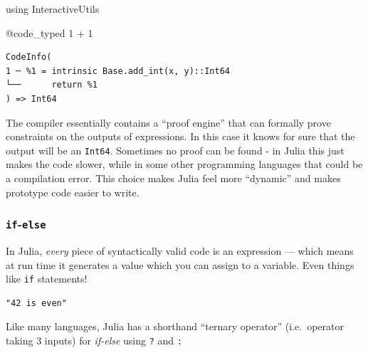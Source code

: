 \documentclass[
]{article}
\newenvironment{Shaded}{\begin{snugshade}}{\end{snugshade}}
\newcommand{\BuiltInTok}[1]{\textcolor[rgb]{0.00,0.23,0.31}{#1}}
\newcommand{\ControlFlowTok}[1]{\textcolor[rgb]{0.00,0.23,0.31}{\textbf{#1}}}
\newcommand{\FloatTok}[1]{\textcolor[rgb]{0.68,0.00,0.00}{#1}}
\newcommand{\ImportTok}[1]{\textcolor[rgb]{0.00,0.46,0.62}{#1}}
\newcommand{\NormalTok}[1]{\textcolor[rgb]{0.00,0.23,0.31}{#1}}
\newcommand{\OperatorTok}[1]{\textcolor[rgb]{0.37,0.37,0.37}{#1}}
\newcommand{\PreprocessorTok}[1]{\textcolor[rgb]{0.68,0.00,0.00}{#1}}
\newcommand{\SpecialCharTok}[1]{\textcolor[rgb]{0.37,0.37,0.37}{#1}}
\newcommand{\StringTok}[1]{\textcolor[rgb]{0.13,0.47,0.30}{#1}}
\begin{document}
\begin{Shaded}
\begin{Highlighting}[]
\ImportTok{using} \BuiltInTok{InteractiveUtils}

\PreprocessorTok{@code\_typed} \FloatTok{1} \OperatorTok{+} \FloatTok{1}
\end{Highlighting}
\end{Shaded}

\begin{verbatim}
CodeInfo(
1 ─ %1 = intrinsic Base.add_int(x, y)::Int64
└──      return %1
) => Int64
\end{verbatim}

The compiler essentially contains a ``proof engine'' that can formally
prove constraints on the outputs of expressions. In this case it knows
for sure that the output will be an \texttt{Int64}. Sometimes no proof
can be found - in Julia this just makes the code slower, while in some
other programming languages that could be a compilation error. This
choice makes Julia feel more ``dynamic'' and makes prototype code easier
to write.

\subsubsection{\texorpdfstring{\texttt{if}-\texttt{else}}{if-else}}\label{if-else}

In Julia, \emph{every} piece of syntactically valid code is an
expression --- which means at run time it generates a value which you
can assign to a variable. Even things like \texttt{if} statements!

\begin{Shaded}
\end{Shaded}

\begin{verbatim}
"42 is even"
\end{verbatim}

Like many languages, Julia has a shorthand ``ternary operator''
(i.e.~operator taking 3 inputs) for \emph{if-else} using \texttt{?} and
\texttt{:}
\end{document}
